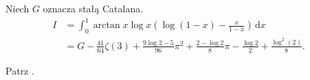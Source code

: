 %

\begin{problem_with_solution}
    \label{valean_1_22}%
    Niech $G$ oznacza stałą Catalana.
    \begin{align}
        I & = \int_0^1 \arctan x \log x \left(\log (1-x) - \frac {x}{1-x}\right) \,\mathrm{d} x \\
        & = G - \frac{41}{64} \zeta (3) + \frac{9 \log 2 - 5}{96} \pi^2 + \frac{2 - \log 2}{8} \pi - \frac {\log 2}{2} + \frac{\log^2 (2)}{8}.
    \end{align} 
\end{problem_with_solution}


\begin{solution}
    Patrz \cite[s. 13]{valean19}.
\end{solution}

%